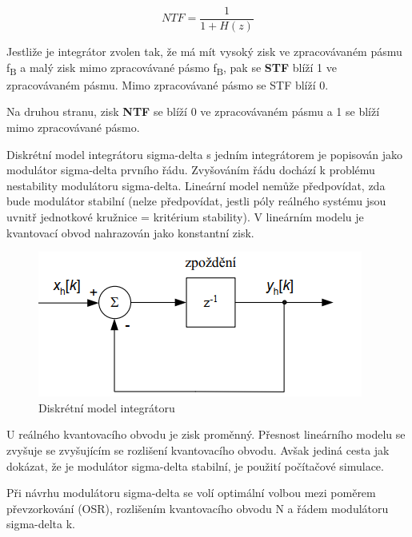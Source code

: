 \begin{equation}
NTF = \frac{1}{1+H(z)}
\end{equation}

Jestliže je integrátor zvolen tak, že má mít vysoký zisk ve zpracovávaném pásmu f\textsubscript{B} a malý zisk mimo zpracovávané pásmo f\textsubscript{B}, pak se \textbf{STF} blíží 1 ve zpracovávaném pásmu. Mimo zpracovávané pásmo se STF blíží 0. 

Na druhou stranu, zisk \textbf{NTF} se blíží 0 ve zpracovávaném pásmu a 1 se blíží mimo zpracovávané pásmo. 

Diskrétní model integrátoru sigma-delta s jedním integrátorem je popisován jako modulátor sigma-delta prvního řádu. Zvyšováním řádu dochází k problému nestability modulátoru sigma-delta. Lineární model nemůže předpovídat, zda bude modulátor stabilní (nelze předpovídat, jestli póly reálného systému jsou uvnitř jednotkové kružnice = kritérium stability). V lineárním modelu je kvantovací obvod nahrazován jako konstantní zisk.
\begin{figure}[h]
   \begin{center}
     \includegraphics[scale=0.6]{images/sigma_dis.png}
   \end{center}
   \caption{Diskrétní model integrátoru}
\end{figure}

\pagebreak
U reálného kvantovacího obvodu je zisk proměnný. Přesnost
lineárního modelu se zvyšuje se zvyšujícím se rozlišení kvantovacího obvodu. Avšak jediná cesta jak dokázat, že je modulátor sigma-delta stabilní, je použití počítačové simulace.

Při návrhu modulátoru sigma-delta se volí optimální volbou mezi poměrem převzorkování (OSR), rozlišením kvantovacího obvodu N a řádem modulátoru sigma-delta k.

